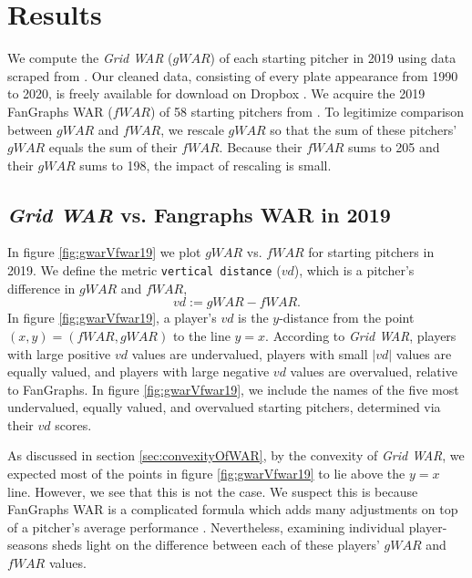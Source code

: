 \documentclass[12pt]{article}
\begin{document}
\section{Results}

We compute the \textit{Grid WAR} ($gWAR$) of each starting pitcher in 2019 using data scraped from \citet{retroRaw}. Our cleaned data, consisting of every plate appearance from 1990 to 2020, is freely available for download on Dropbox \citep{dropboxRetrosheet}. We acquire the 2019 FanGraphs WAR ($fWAR$) of 58 starting pitchers from \citet{Fangraphs2019War}. To legitimize comparison between $gWAR$ and $fWAR$, we rescale $gWAR$ so that the sum of these pitchers' $gWAR$ equals the sum of their $fWAR$. Because their $fWAR$ sums to 205 and their $gWAR$ sums to 198, the impact of rescaling is small. 

\subsection{\textit{Grid WAR} vs. Fangraphs WAR in 2019}

In figure \ref{fig:gwarVfwar19} we plot $gWAR$ vs. $fWAR$ for starting pitchers in 2019. We define the metric \texttt{vertical distance} ($vd$), which is a pitcher's difference in $gWAR$ and $fWAR$,
\begin{equation}
vd := gWAR - fWAR.
\label{eqn:vd}
\end{equation}
In figure \ref{fig:gwarVfwar19}, a player's $vd$ is the $y$-distance from the point $(x,y)=(fWAR,gWAR)$ to the line $y=x$. According to \textit{Grid WAR}, players with large positive $vd$ values are undervalued, players with small $|vd|$ values are equally valued, and players with large negative $vd$ values are overvalued, relative to FanGraphs. In figure \ref{fig:gwarVfwar19}, we include the names of the five most undervalued, equally valued, and overvalued starting pitchers, determined via their $vd$ scores. 

As discussed in section \ref{sec:convexityOfWAR}, by the convexity of \textit{Grid WAR}, we expected most of the points in figure \ref{fig:gwarVfwar19} to lie above the $y=x$ line. However, we see that this is not the case. We suspect this is because FanGraphs WAR is a complicated formula which adds many adjustments on top of a pitcher's average performance \citep{war_FG}. Nevertheless, examining individual player-seasons sheds light on the difference between each of these players' $gWAR$ and $fWAR$ values. 
\end{document}
